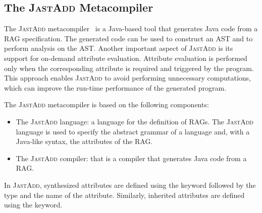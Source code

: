 \subsection{The \textsc{JastAdd} Metacompiler}%
\label{sec:jastadd}
The \textsc{JastAdd} metacompiler~\cite{DBLP:journals/entcs/HedinM01} is a Java-based tool that generates
Java code from a RAG specification. The generated code can be used to construct an AST and to perform
analysis on the AST.
Another important aspect of \textsc{JastAdd} is its support for on-demand attribute evaluation.
Attribute evaluation is performed only when the corresponding
attribute is required and triggered by the program. This approach enables \textsc{JastAdd} to
avoid performing unnecessary computations, which can improve the run-time
performance of the generated program.

The \textsc{JastAdd} metacompiler is based on the following components:
\begin{itemize}
    \item The \textsc{JastAdd} language: a language for the definition of RAGs.
    The \textsc{JastAdd} language is used to specify the abstract grammar of a language and,
    with a Java-like syntax, the attributes of the RAG.
    \item The \textsc{JastAdd} compiler: that is a compiler that generates Java code from a RAG.
\end{itemize}
In \textsc{JastAdd}, synthesized attributes are defined using the  keyword followed
by the type and the name of the attribute. Similarly, inherited attributes are defined
using the  keyword.

